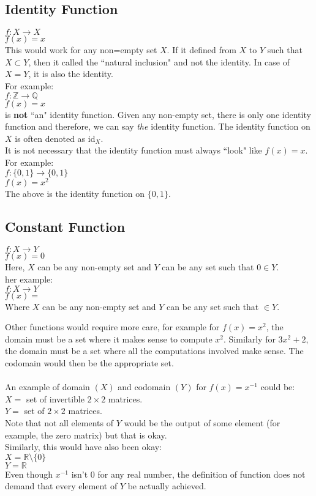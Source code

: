 \subsection{Identity Function}
$f:X\to X$\\
$f(x) = x$\\
This would work for any non=empty set $X$. If it defined from $X$ to $Y$ such that $X\subset Y$, then it called the ``natural inclusion" and not the identity. In case of $X = Y$, it is also the identity.\\
For example:\\
$f:\mathbb{Z} \to \mathbb{Q}$\\
$f(x) = x$\\
is \textbf{not} ``an" identity function. Given any non-empty set, there is only one identity function and therefore, we can say \textit{the} identity function. The identity function on $X$ is often denoted as id$_X$.\\
It is not necessary that the identity function must always ``look" like $f(x) = x$. For example:\\
$f:\{0, 1\} \to \{0, 1\}$\\
$f(x) = x^2$\\
The above is the identity function on $\{0, 1\}$.

\dotfill
\subsection{Constant Function}
$f:X\to Y$\\
$f(x) = 0$\\
Here, $X$ can be any non-empty set and $Y$ can be any set such that $0\in Y$.\\
her example:\\
$f:X\to Y$\\
$f(x) =$\\
Where $X$ can be any non-empty set and $Y$ can be any set such that
$\in Y$.

\dotfill

Other functions would require more care, for example for $f(x)=x^2$, the domain must be a set where it makes sense to compute $x^2$. Similarly for $3x^2+2$, the domain must be a set where all the computations involved make sense. The codomain would then be the appropriate set.\\~\\
An example of domain $(X)$ and codomain $(Y)$ for $f(x) = x^{-1}$ could be:\\
$X=$ set of invertible $2\times2$ matrices.\\
$Y=$ set of $2\times2$ matrices.\\
Note that not all elements of $Y$ would be the output of some element (for example, the zero matrix) but that is okay.\\
Similarly, this would have also been okay:\\
$X = \mathbb{R}\setminus\{0\}$\\
$Y = \mathbb{R}$\\
Even though $x^{-1}$ isn't $0$ for any real number, the definition of function does not demand that every element of $Y$ be actually achieved.

